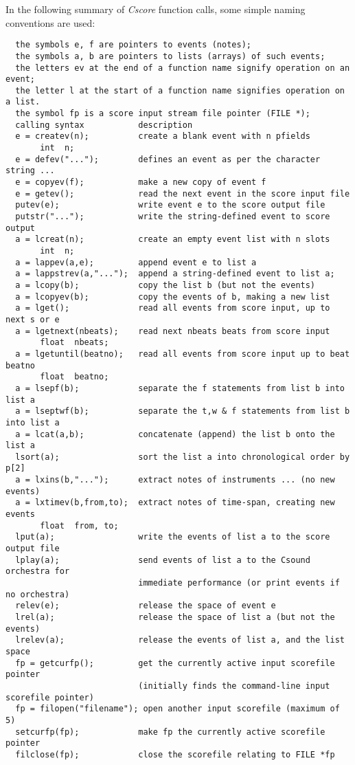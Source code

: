   In the following summary of\emph{ Cscore}
 function calls, some simple naming conventions are used: 


 
\begin{lstlisting}
  the symbols e, f are pointers to events (notes);
  the symbols a, b are pointers to lists (arrays) of such events;
  the letters ev at the end of a function name signify operation on an event;
  the letter l at the start of a function name signifies operation on a list.
  the symbol fp is a score input stream file pointer (FILE *);
  calling syntax           description
  e = createv(n);          create a blank event with n pfields
       int  n;
  e = defev("...");        defines an event as per the character string ...
  e = copyev(f);           make a new copy of event f
  e = getev();             read the next event in the score input file
  putev(e);                write event e to the score output file
  putstr("...");           write the string-defined event to score output
  a = lcreat(n);           create an empty event list with n slots
       int  n;
  a = lappev(a,e);         append event e to list a
  a = lappstrev(a,"...");  append a string-defined event to list a;
  a = lcopy(b);            copy the list b (but not the events)
  a = lcopyev(b);          copy the events of b, making a new list
  a = lget();              read all events from score input, up to next s or e
  a = lgetnext(nbeats);    read next nbeats beats from score input
       float  nbeats;
  a = lgetuntil(beatno);   read all events from score input up to beat beatno 
       float  beatno;
  a = lsepf(b);            separate the f statements from list b into list a
  a = lseptwf(b);          separate the t,w & f statements from list b into list a
  a = lcat(a,b);           concatenate (append) the list b onto the list a
  lsort(a);                sort the list a into chronological order by p[2]
  a = lxins(b,"...");      extract notes of instruments ... (no new events)
  a = lxtimev(b,from,to);  extract notes of time-span, creating new events
       float  from, to;
  lput(a);                 write the events of list a to the score output file
  lplay(a);                send events of list a to the Csound orchestra for
                           immediate performance (or print events if no orchestra)
  relev(e);                release the space of event e
  lrel(a);                 release the space of list a (but not the events)
  lrelev(a);               release the events of list a, and the list space
  fp = getcurfp();         get the currently active input scorefile pointer
                           (initially finds the command-line input scorefile pointer)
  fp = filopen("filename"); open another input scorefile (maximum of 5)
  setcurfp(fp);            make fp the currently active scorefile pointer
  filclose(fp);            close the scorefile relating to FILE *fp
      
\end{lstlisting}


 


\begin{comment}
\begin{tabular}{lcr}
Previous &Home &Next \\
srconv &Up &Writing a Main Program

\end{tabular}



\end{comment}
